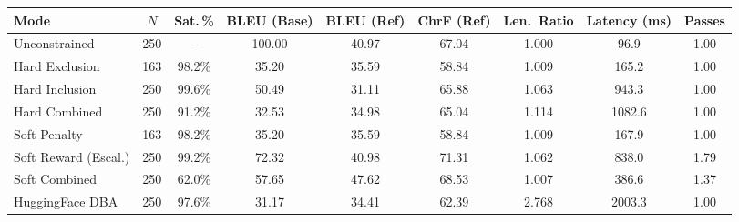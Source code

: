 \documentclass{CUP-JNL-NLP}
\begin{document}
\begin{table}[htbp]
  {\tablefont\begin{minipage}{\textwidth}
    \setlength{\tabcolsep}{3.5pt}
    \begin{tabular}{lcccccccc}
      \toprule
      Mode & $N$ & Sat.\,\% & BLEU (Base) & BLEU (Ref) & ChrF (Ref) &
        Len.\ Ratio & Latency (ms) & Passes \\
      \midrule
      Unconstrained        & 250 & --     & 100.00 & 40.97 & 67.04 & 1.000 & \phantom{0}96.9  & 1.00 \\
      \midrule
      Hard Exclusion       & 163 & 98.2\% & \phantom{0}35.20 & 35.59 & 58.84 & 1.009 & \phantom{00}165.2 & 1.00 \\
      Hard Inclusion       & 250 & 99.6\% & \phantom{0}50.49 & 31.11 & 65.88 & 1.063 & \phantom{00}943.3 & 1.00 \\
      Hard Combined        & 250 & 91.2\% & \phantom{0}32.53 & 34.98 & 65.04 & 1.114 & 1082.6 & 1.00 \\
      \midrule
      Soft Penalty         & 163 & 98.2\% & \phantom{0}35.20 & 35.59 & 58.84 & 1.009 & \phantom{00}167.9 & 1.00 \\
      Soft Reward (Escal.) & 250 & 99.2\% & \phantom{0}72.32 & 40.98 & 71.31 & 1.062 & \phantom{00}838.0 & 1.79 \\
      Soft Combined        & 250 & 62.0\% & \phantom{0}57.65 & 47.62 & 68.53 & 1.007 & \phantom{00}386.6 & 1.37 \\
      \midrule
      HuggingFace DBA      & 250 & 97.6\% & \phantom{0}31.17 & 34.41 & 62.39 & 2.768 & 2003.3 & 1.00 \\
      \bottomrule
    \end{tabular}
  \end{minipage}}
  {}
  \label{tab:results_en_tr}
\end{table}
\end{document}
